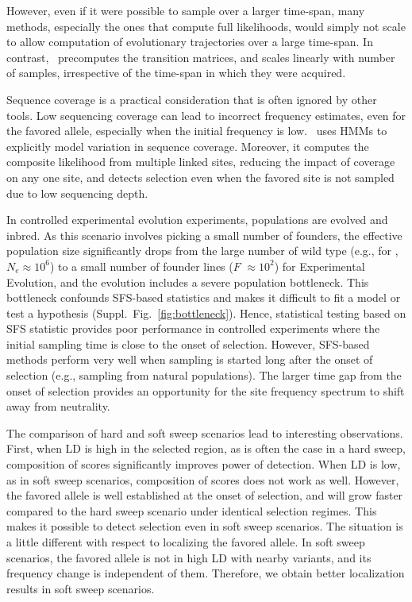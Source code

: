 However, even if it were possible to sample over a larger time-span,
many methods, especially the ones that compute full likelihoods, would
simply not scale to allow computation of evolutionary trajectories
over a large time-span. In contrast, \comale\ precomputes the
transition matrices, and scales linearly with number of samples,
irrespective of the time-span in which they were acquired.

Sequence coverage is a practical consideration that is often ignored
by other tools. Low sequencing coverage can lead to incorrect
frequency estimates, even for the favored allele, especially when the
initial frequency is low. \comale\ uses HMMs to explicitly model
variation in sequence coverage. Moreover, it computes the composite
likelihood from multiple linked sites, reducing the impact of coverage
on any one site, and detects selection even when the favored site is
not sampled due to low sequencing depth.


In controlled experimental evolution experiments, populations are
evolved and inbred. As this scenario involves picking a small number
of founders, the effective population size significantly drops from
the large number of wild type (e.g., for \dmel, $N_e\approx10^6$) to a
small number of founder lines ($F$ $\approx 10^2$) for Experimental
Evolution, and the evolution includes a severe population
bottleneck. This bottleneck confounds SFS-based statistics and makes
it difficult to fit a model or test a hypothesis
(Suppl.~Fig.~\ref{fig:bottleneck}).  Hence, statistical testing based
on SFS statistic provides poor performance in controlled experiments
where the initial sampling time is close to the onset of selection.
However, SFS-based methods perform very well when sampling is started
long after the onset of selection (e.g., sampling from natural
populations). The larger time gap from the onset of selection provides
an opportunity for the site frequency spectrum to shift away from
neutrality.



The comparison of hard and soft sweep scenarios lead to interesting
observations. First, when LD is high in the selected region, as is
often the case in a hard sweep, composition of scores significantly
improves power of detection. When LD is low, as in soft sweep
scenarios, composition of scores does not work as well. However, the
favored allele is well established at the onset of selection, and will
grow faster compared to the hard sweep scenario under identical
selection regimes. This makes it possible to detect selection even in
soft sweep scenarios. The situation is a little different with respect
to localizing the favored allele. In soft sweep scenarios, the favored
allele is not in high LD with nearby variants, and its frequency
change is independent of them. Therefore, we obtain better
localization results in soft sweep scenarios.

